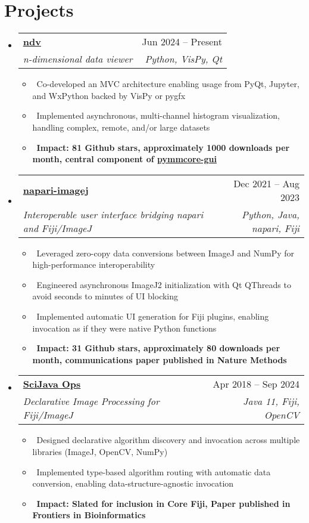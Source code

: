 \documentclass[letterpaper,10pt]{article}
\makeatletter
\newcommand{\resumeItem}[1]{\item\small{#1}}
\newcommand{\resumeSubheading}[4]{
\vspace{-1pt}\item
  \begin{tabular*}{0.97\textwidth}[t]{l@{\extracolsep{\fill}}r}
    \textbf{#1} & #2 \\
    \textit{#3} & \textit{#4} \\
  \end{tabular*}\vspace{-7pt}
}
\newcommand{\resumeSubHeadingList}{\begin{itemize}[leftmargin=0.15in, label={}]}
\newcommand{\resumeSubHeadingListEnd}{\end{itemize}}
\makeatother
\begin{document}
\section{Projects}
\resumeSubHeadingList
  \resumeSubheading
      {\href{https://pyapp-kit.github.io/ndv/latest/}{ndv}}{Jun 2024 -- Present}
      {n-dimensional data viewer}{Python, VisPy, Qt}
      \resumeSubHeadingList
          \resumeItem{\textbullet\ Co-developed an MVC architecture enabling usage from PyQt, Jupyter, and WxPython backed by VisPy or pygfx}
          \resumeItem{\textbullet\ Implemented asynchronous, multi-channel histogram visualization, handling complex, remote, and/or large datasets}
          \resumeItem{\textbullet\ \textbf{Impact: 81 Github stars, approximately 1000 downloads per month, central component of \href{https://github.com/pymmcore-plus/pymmcore-gui}{pymmcore-gui}}}
      \resumeSubHeadingListEnd
  \resumeSubheading
      {\href{https://napari.imagej.net/en/stable/}{napari-imagej}}{Dec 2021 -- Aug 2023}
      {Interoperable user interface bridging napari and Fiji/ImageJ}{Python, Java, napari, Fiji}
      \resumeSubHeadingList
        \resumeItem{\textbullet\ Leveraged zero-copy data conversions between ImageJ and NumPy for high-performance interoperability}
        \resumeItem{\textbullet\ Engineered asynchronous ImageJ2 initialization with Qt QThreads to avoid seconds to minutes of UI blocking}
        \resumeItem{\textbullet\ Implemented automatic UI generation for Fiji plugins, enabling invocation as if they were native Python functions}
        \resumeItem{\textbullet\ \textbf{Impact: 31 Github stars, approximately 80 downloads per month, communications paper published in Nature Methods}}
      \resumeSubHeadingListEnd
\resumeSubheading
      {\href{https://ops.scijava.org/en/latest/}{SciJava Ops}}{Apr 2018 -- Sep 2024}
      {Declarative Image Processing for Fiji/ImageJ}{Java 11, Fiji, OpenCV}
      \resumeSubHeadingList
        \resumeItem{\textbullet\ Designed declarative algorithm discovery and invocation across multiple libraries (ImageJ, OpenCV, NumPy)}
        \resumeItem{\textbullet\ Implemented type-based algorithm routing with automatic data conversion, enabling data-structure-agnostic invocation}
        \resumeItem{\textbullet\ \textbf{Impact: Slated for inclusion in Core Fiji, Paper published in Frontiers in Bioinformatics}}
      \resumeSubHeadingListEnd
\resumeSubHeadingListEnd
\end{document}
